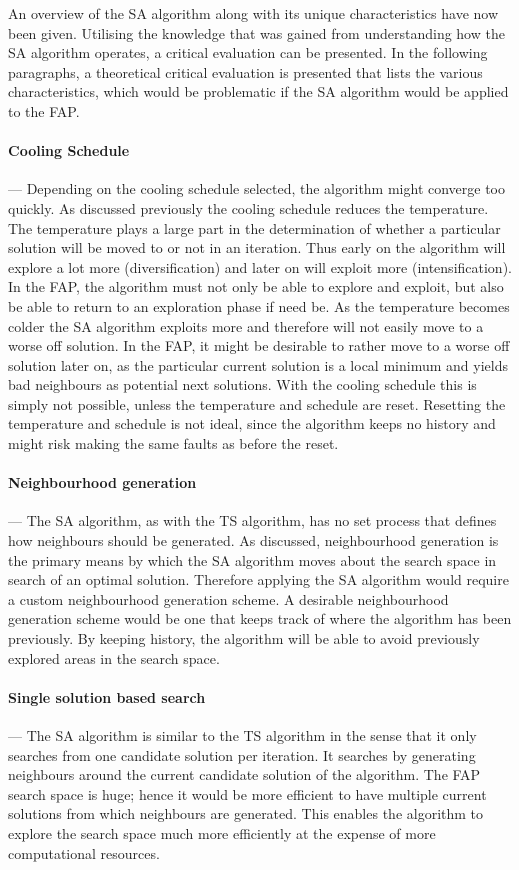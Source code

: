 An overview of the \gls{SA} algorithm along with its unique characteristics have now been given. Utilising the knowledge that was gained from understanding how the \gls{SA} algorithm operates, a critical evaluation can be presented. In the following paragraphs, a theoretical critical evaluation is presented that lists the various characteristics, which would be problematic if the \gls{SA} algorithm would be applied to the \gls{FAP}.

\paragraph{Cooling Schedule}
--- Depending on the cooling schedule selected, the algorithm might converge too quickly. As discussed previously the cooling schedule reduces the temperature. The temperature plays a large part in the determination of whether a particular solution will be moved to or not in an iteration. Thus early on the algorithm will explore a lot more (diversification) and later on will exploit more (intensification). In the \gls{FAP}, the algorithm must not only be able to explore and exploit, but also be able to return to an exploration phase if need be.
As the temperature becomes colder the \gls{SA} algorithm exploits more and therefore will not easily move to a worse off solution. In the \gls{FAP}, it might be desirable to rather move to a worse off solution later on, as the particular current solution is a local minimum and yields bad neighbours as potential next solutions. With the cooling schedule this is simply not possible, unless the temperature and schedule are reset. Resetting the temperature and schedule is not ideal, since the algorithm keeps no history and might risk making the same faults as before the reset.
\paragraph{Neighbourhood generation}
--- The \gls{SA} algorithm, as with the \gls{TS} algorithm, has no set process that defines how neighbours should be generated. As discussed, neighbourhood generation is the primary means by which the \gls{SA} algorithm moves about the search space in search of an optimal solution. Therefore applying the \gls{SA} algorithm would require a custom neighbourhood generation scheme. A desirable neighbourhood generation scheme would be one that keeps track of where the algorithm has been previously. By keeping history, the algorithm will be able to avoid previously explored areas in the search space.
\paragraph{Single solution based search}
--- The \gls{SA} algorithm is similar to the \gls{TS} algorithm in the sense that it only searches from one candidate solution per iteration. It searches by generating neighbours around the current candidate solution of the algorithm. The \gls{FAP} search space is huge; hence it would be more efficient to have multiple current solutions from which neighbours are generated. This enables the algorithm to explore the search space much more efficiently at the expense of more computational resources.

